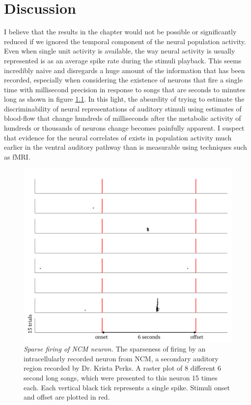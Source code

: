 \chapter{Discussion}
I believe that the results in the \CP chapter would not be possible or significantly reduced if we ignored the temporal component of the neural population activity. Even when single unit activity is available, the way neural activity is usually represented is as an average spike rate during the stimuli playback. This seems incredibly naive and disregards a huge amount of the information that has been recorded, especially when considering the existence of neurons that fire a single time with millisecond precision in response to songs that are seconds to minutes long as shown in figure \ref{fig:sparse}. In this light, the absurdity of trying to estimate the discriminability of neural representations of auditory stimuli using estimates of blood-flow that change hundreds of milliseconds after the metabolic activity of hundreds or thousands of neurons change becomes painfully apparent. I suspect that evidence for the neural correlates of \CP exists in population activity much earlier in the ventral auditory pathway than is measurable using techniques such as fMRI.

\begin{figure}[tbp] 
  \centering
  \includegraphics[width=.9\textwidth]{figures/sparse.png}
  \caption[Sparse firing of NCM neuron.]
{\emph{Sparse firing of NCM neuron.} The sparseness of firing by an intracellularly recorded neuron from NCM, a secondary auditory region recorded by Dr. Krista Perks. A raster plot of 8 different 6 second long songs, which were presented to this neuron 15 times each. Each vertical black tick represents a single spike. Stimuli onset and offset are plotted in red.
}
  \label{fig:sparse}
\end{figure}

